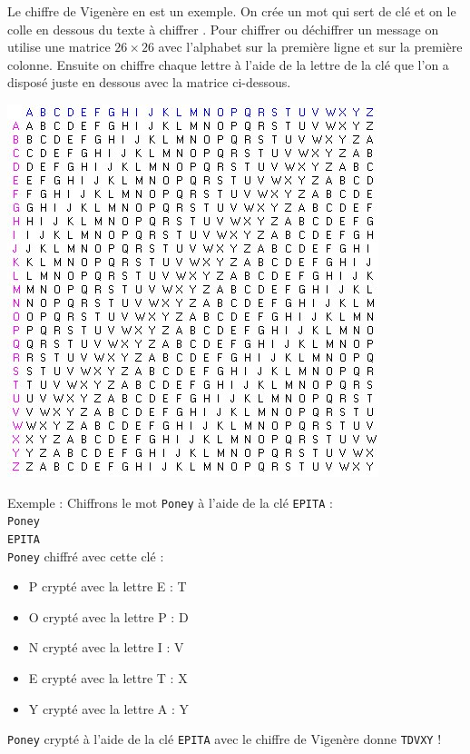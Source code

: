 \documentclass[a4paper,12pt]{article}
\begin{document}
Le chiffre de Vigenère en est un exemple. On crée un mot qui sert de clé et \og on le colle en dessous du texte à chiffrer \fg{}. Pour chiffrer ou déchiffrer un message on utilise une matrice $26 \times 26$ avec l'alphabet sur la première ligne et sur la première colonne. Ensuite on chiffre chaque lettre à l'aide de la lettre de la clé que l'on a disposé juste en dessous avec la matrice ci-dessous.

\begin{center}
  \includegraphics[scale=0.75]{../Image/matrice.jpg}
\end{center}

Exemple : Chiffrons le mot \texttt{Poney} à l'aide de la clé \texttt{EPITA} :\\
\texttt{Poney} \\
\texttt{EPITA} \\
\texttt{Poney} chiffré avec cette clé :
\begin{itemize}
\item P crypté avec la lettre E : T
\item O crypté avec la lettre P : D
\item N crypté avec la lettre I : V
\item E crypté avec la lettre T : X
\item Y crypté avec la lettre A : Y
\end{itemize}
\texttt{Poney} crypté à l'aide de la clé \texttt{EPITA} avec le chiffre de Vigenère donne \texttt{TDVXY} !
\end{document}
